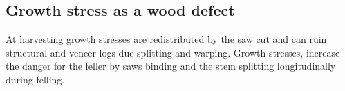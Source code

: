 \subsection{Growth stress as a wood defect}
\label{subsection:Growth stress as a wood defect}
At harvesting growth stresses are redistributed by the saw cut
and can ruin structural and veneer logs due splitting and
warping. Growth stresses, increase the
danger for the feller by saws binding and the stem splitting longitudinally during felling.